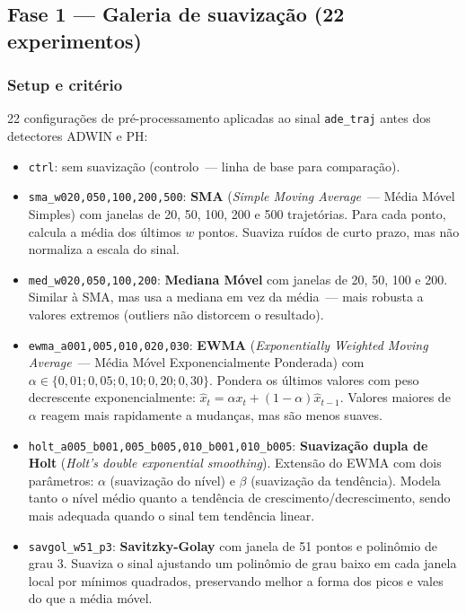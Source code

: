 \documentclass[11pt,a4paper]{article}
\begin{document}
\subsection{Fase 1 --- Galeria de suaviza\c{c}\~ao (22 experimentos)}

\subsubsection{Setup e crit\'erio}

22 configura\c{c}\~oes de pr\'e-processamento aplicadas ao sinal
\texttt{ade\_traj} antes dos detectores ADWIN e PH:

\begin{itemize}[leftmargin=1.4em,itemsep=2pt]
    \item \texttt{ctrl}: sem suaviza\c{c}\~ao (controlo~--- linha de base para compara\c{c}\~ao).
    \item \texttt{sma\_w020,050,100,200,500}: \textbf{SMA} (\emph{Simple Moving Average}~--- M\'edia M\'ovel Simples) com janelas de 20, 50, 100, 200 e 500 trajet\'orias. Para cada ponto, calcula a m\'edia dos \'ultimos $w$ pontos. Suaviza ru\'idos de curto prazo, mas n\~ao normaliza a escala do sinal.
    \item \texttt{med\_w020,050,100,200}: \textbf{Mediana M\'ovel} com janelas de 20, 50, 100 e 200. Similar \`a SMA, mas usa a mediana em vez da m\'edia~--- mais robusta a valores extremos (outliers n\~ao distorcem o resultado).
    \item \texttt{ewma\_a001,005,010,020,030}: \textbf{EWMA} (\emph{Exponentially Weighted Moving Average}~--- M\'edia M\'ovel Exponencialmente Ponderada) com $\alpha \in \{0{,}01; 0{,}05; 0{,}10; 0{,}20; 0{,}30\}$. Pondera os \'ultimos valores com peso decrescente exponencialmente: $\hat{x}_t = \alpha x_t + (1-\alpha)\hat{x}_{t-1}$. Valores maiores de $\alpha$ reagem mais rapidamente a mudan\c{c}as, mas s\~ao menos suaves.
    \item \texttt{holt\_a005\_b001,005\_b005,010\_b001,010\_b005}: \textbf{Suaviza\c{c}\~ao dupla de Holt} (\emph{Holt's double exponential smoothing}). Extens\~ao do EWMA com dois par\^ametros: $\alpha$ (suaviza\c{c}\~ao do n\'ivel) e $\beta$ (suaviza\c{c}\~ao da tend\^encia). Modela tanto o n\'ivel m\'edio quanto a tend\^encia de crescimento/decrescimento, sendo mais adequada quando o sinal tem tend\^encia linear.
    \item \texttt{savgol\_w51\_p3}: \textbf{Savitzky-Golay} com janela de 51 pontos e polin\^omio de grau 3. Suaviza o sinal ajustando um polin\^omio de grau baixo em cada janela local por m\'inimos quadrados, preservando melhor a forma dos picos e vales do que a m\'edia m\'ovel.

\end{itemize}
\end{document}

